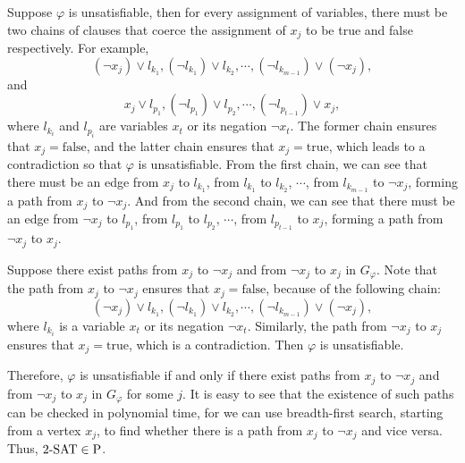 \documentclass{homework}
\begin{document}
\begin{solution}

  Suppose $\varphi$ is unsatisfiable,
  then for every assignment of variables,
  there must be two chains of clauses that
  coerce the assignment of $x_j$ to be true and false respectively.
  For example,
  \begin{equation*}
    (\lnot x_j) \lor l_{k_1}, (\lnot l_{k_1}) \lor l_{k_2}, \cdots, (\lnot l_{k_{m-1}}) \lor (\lnot x_j),
  \end{equation*}
  and
  \begin{equation*}
    x_j \lor l_{p_1}, (\lnot l_{p_1}) \lor l_{p_2}, \cdots, (\lnot l_{p_{t-1}}) \lor x_j,
  \end{equation*}
  where $l_{k_i}$ and $l_{p_i}$ are variables $x_t$ or its negation $\lnot x_t$.
  The former chain ensures that $x_j = \text{false}$,
  and the latter chain ensures that $x_j = \text{true}$,
  which leads to a contradiction so that $\varphi$ is unsatisfiable.
  From the first chain, we can see that there must be an edge from $x_j$ to $l_{k_1}$,
  from $l_{k_1}$ to $l_{k_2}$, $\cdots$, from $l_{k_{m-1}}$ to $\lnot x_j$,
  forming a path from $x_j$ to $\lnot x_j$.
  And from the second chain, we can see that there must be an edge from $\lnot x_j$ to $l_{p_1}$,
  from $l_{p_1}$ to $l_{p_2}$, $\cdots$, from $l_{p_{t-1}}$ to $x_j$,
  forming a path from $\lnot x_j$ to $x_j$.

  Suppose there exist paths from $x_j$ to $\lnot x_j$ and from $\lnot x_j$ to $x_j$ in $G_{\varphi}$.
  Note that the path from $x_j$ to $\lnot x_j$ ensures that $x_j = \text{false}$,
  because of the following chain:
  \begin{equation*}
    (\lnot x_j) \lor l_{k_1}, (\lnot l_{k_1}) \lor l_{k_2}, \cdots, (\lnot l_{k_{m-1}}) \lor (\lnot x_j),
  \end{equation*}
  where $l_{k_i}$ is a variable $x_t$ or its negation $\lnot x_t$.
  Similarly, the path from $\lnot x_j$ to $x_j$ ensures that $x_j = \text{true}$,
  which is a contradiction.
  Then $\varphi$ is unsatisfiable.

  Therefore, $\varphi$ is unsatisfiable if and only if there exist paths from $x_{j}$ to $\neg x_{j}$ and from $\neg x_{j}$ to $x_{j}$ in $G_{\varphi}$ for some $j$.
  It is easy to see that the existence of such paths can be checked in polynomial time,
  for we can use breadth-first search, starting from a vertex $x_j$,
  to find whether there is a path from $x_j$ to $\lnot x_j$ and vice versa.
  Thus, $2\text{-}\mathrm{SAT} \in \textup{P}$.

\end{solution}
\end{document}
